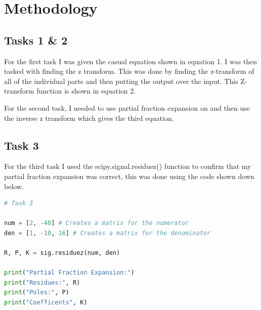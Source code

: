 \documentclass[12pt]{report}
\begin{document}
\section{Methodology}
\subsection{Tasks 1 \& 2}
For the first task I was given the casual equation shown in equation 1.
I was then tasked with finding the z transform. This was done by finding
the z-transform of all of the individual parts and then putting the output
over the input. This Z-transform function is shown in equation 2.

For the second task, I needed to use partial fraction expansion on and then
use the inverse z transform which gives the third equation.
\subsection{Task 3}
For the third task I used the scipy.signal.residuez() function to confirm
that my partial fraction expansion was correct, this was done using the
code shown down below.
\begin{lstlisting}[language=Python]
# Task 3

num = [2, -40] # Creates a matrix for the numerator
den = [1, -10, 16] # Creates a matrix for the denominator

R, P, K = sig.residuez(num, den)

print("Partial Fraction Expansion:")
print("Residues:", R)
print("Poles:", P)
print("Coefficents", K)
\end{lstlisting}
\end{document}
